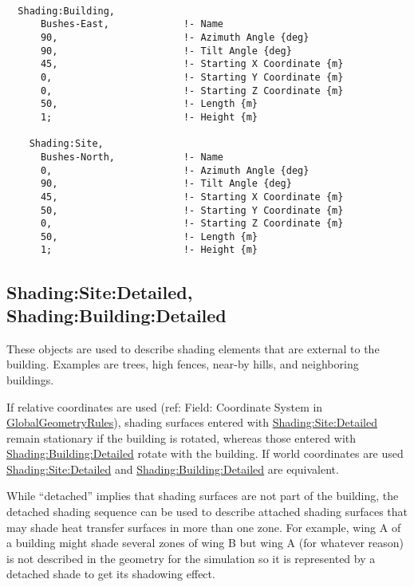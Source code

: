 \begin{lstlisting}

  Shading:Building,
      Bushes-East,             !- Name
      90,                      !- Azimuth Angle {deg}
      90,                      !- Tilt Angle {deg}
      45,                      !- Starting X Coordinate {m}
      0,                       !- Starting Y Coordinate {m}
      0,                       !- Starting Z Coordinate {m}
      50,                      !- Length {m}
      1;                       !- Height {m}

    Shading:Site,
      Bushes-North,            !- Name
      0,                       !- Azimuth Angle {deg}
      90,                      !- Tilt Angle {deg}
      45,                      !- Starting X Coordinate {m}
      50,                      !- Starting Y Coordinate {m}
      0,                       !- Starting Z Coordinate {m}
      50,                      !- Length {m}
      1;                       !- Height {m}
\end{lstlisting}

\subsection{Shading:Site:Detailed, Shading:Building:Detailed}\label{shadingsitedetailed-shadingbuildingdetailed}

These objects are used to describe shading elements that are external to the building. Examples are trees, high fences, near-by hills, and neighboring buildings.

If relative coordinates are used (ref: Field: Coordinate System in \hyperref[globalgeometryrules]{GlobalGeometryRules}), shading surfaces entered with \hyperref[shadingsitedetailed-shadingbuildingdetailed]{Shading:Site:Detailed} remain stationary if the building is rotated, whereas those entered with \hyperref[shadingsitedetailed-shadingbuildingdetailed]{Shading:Building:Detailed} rotate with the building. If world coordinates are used \hyperref[shadingsitedetailed-shadingbuildingdetailed]{Shading:Site:Detailed} and \hyperref[shadingsitedetailed-shadingbuildingdetailed]{Shading:Building:Detailed} are equivalent.

While ``detached'' implies that shading surfaces are not part of the building, the detached shading sequence can be used to describe attached shading surfaces that may shade heat transfer surfaces in more than one zone. For example, wing A of a building might shade several zones of wing B but wing A (for whatever reason) is not described in the geometry for the simulation so it is represented by a detached shade to get its shadowing effect.

